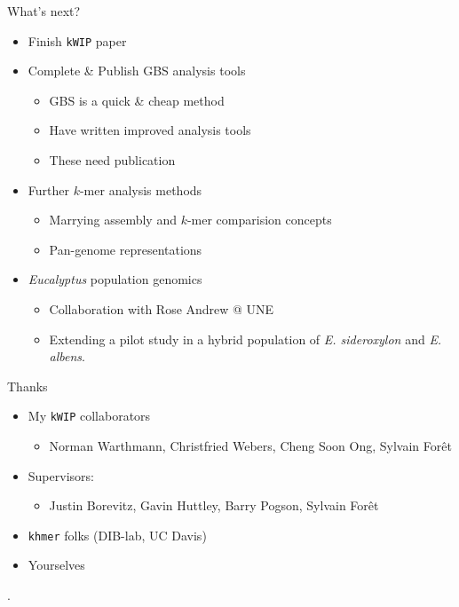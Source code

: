 \documentclass[t]{beamer}
\begin{document}
\begin{frame}{What's next?}
  \begin{itemize}
    \item Finish \texttt{kWIP} paper
    \item Complete \& Publish GBS analysis tools
    \begin{itemize}
      \item GBS is a quick \& cheap method
      \item Have written improved analysis tools
      \item These need publication
    \end{itemize}
    \pause
    \item Further $k$-mer analysis methods
      \begin{itemize}
        \item Marrying assembly and $k$-mer comparision concepts
        \item Pan-genome representations
      \end{itemize}
    \item \textit{Eucalyptus} population genomics
      \begin{itemize}
        \item Collaboration with Rose Andrew @ UNE
        \item Extending a pilot study in a hybrid population of
          \textit{E. sideroxylon} and \textit{E. albens}.
      \end{itemize}
  \end{itemize}
\end{frame}

\begin{frame}{Thanks}
  \begin{itemize}
    \item My \texttt{kWIP} collaborators
      \begin{itemize}
        \item Norman Warthmann, Christfried Webers, Cheng Soon Ong, Sylvain For\^{e}t
      \end{itemize}
    \item Supervisors:
      \begin{itemize}
        \item Justin Borevitz, Gavin Huttley, Barry Pogson, Sylvain For\^{e}t
      \end{itemize}
    \item \texttt{khmer} folks (DIB-lab, UC Davis)
    \item Yourselves
  \end{itemize}
\end{frame}

\begin{frame}[shrink=20]{}
  \printbibliography
  \vfill
  .
\end{frame}
\end{document}
